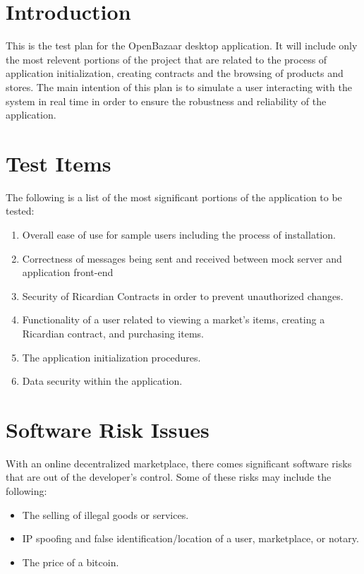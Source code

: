\documentclass{article}
\begin{document}
\section*{Introduction}
This is the test plan for the OpenBazaar desktop application.
It will include only the most relevent portions of the project that are related to the process of application initialization, creating contracts and the browsing of products and stores.
The main intention of this plan is to simulate a user interacting with the system in real time in order to ensure the robustness and reliability of the application.

\section*{Test Items}
The following is a list of the most significant portions of the application to be tested:
\newline
\begin{enumerate}
\item
Overall ease of use for sample users including the process of installation.
\item
Correctness of messages being sent and received between mock server and application front-end
\item
Security of Ricardian Contracts in order to prevent unauthorized changes.
\item
Functionality of a user related to viewing a market's items, creating a Ricardian contract, and purchasing items.
\item
The application initialization procedures.
\item
Data security within the application.


\end{enumerate}

\section*{Software Risk Issues}
With an online decentralized marketplace, there comes significant software risks that are out of the developer's control.
Some of these risks may include the following:
\newline
\begin{itemize}
 \item
The selling of illegal goods or services.
 \item
IP spoofing and false identification/location of a user, marketplace, or notary.
 \item
The price of a bitcoin.
\end{itemize}
\end{document}
